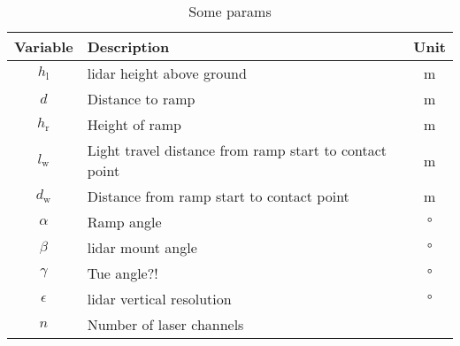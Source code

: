 \begin{table}[htbp]
	\centering
	\caption{Some params}
	\label{tab:vals}
	\begin{tabular}[t]{clc}
		\toprule
		\textbf{Variable} & \textbf{Description}                                   & \textbf{Unit} \\
		\midrule
		$h_\mathrm{l} $   & \gls{lidar} height above ground                        & \si{\metre}   \\
		$d$               & Distance to ramp                                       & \si{\metre}   \\
		$h_\mathrm{r}$    & Height of ramp                                         & \si{\metre}   \\
		$l_\mathrm{w}$    & Light travel distance from ramp start to contact point & \si{\metre}   \\
		$d_\mathrm{w}$    & Distance from ramp start to contact point              & \si{\metre}   \\
		$\alpha$          & Ramp angle                                             & \si{\degree}  \\
		$\beta$           & \gls{lidar} mount angle                                & \si{\degree}  \\
		$\gamma$          & Tue angle?!                                            & \si{\degree}  \\
		$\epsilon$        & \gls{lidar} vertical resolution                        & \si{\degree}  \\
		$n$               & Number of laser channels                               &               \\
		\bottomrule
	\end{tabular}
\end{table}

